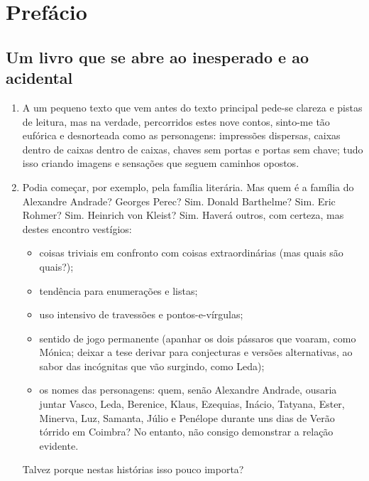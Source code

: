 \chapter{Prefácio}

\section{Um livro que se abre ao inesperado e ao acidental}

\begin{enumerate}
\item A um pequeno texto que vem antes do texto principal pede-se clareza e
pistas de leitura, mas na verdade, percorridos estes nove contos,
sinto-me tão eufórica e desnorteada como as personagens: impressões
dispersas, caixas dentro de caixas dentro de caixas, chaves sem portas e
portas sem chave; tudo isso criando imagens e sensações que seguem
caminhos opostos.

\item Podia começar, por exemplo, pela família literária. Mas quem é a
família do Alexandre Andrade? Georges Perec? Sim. Donald Barthelme? Sim. Eric Rohmer? Sim.
Heinrich von Kleist? Sim. Haverá outros, com certeza, mas destes encontro vestígios:

\begin{itemize}
\item{} coisas triviais em confronto com coisas extraordinárias (mas quais
são quais?);

\item{} tendência para enumerações e listas;

\item{} uso intensivo de travessões e pontos-e-vírgulas;

\item{} sentido de jogo permanente (apanhar os dois pássaros que voaram, como
Mónica; deixar a tese derivar para conjecturas e versões alternativas, ao sabor das incógnitas que vão
surgindo, como Leda);

\item{} os nomes das personagens: quem, senão Alexandre Andrade, ousaria
juntar Vasco, Leda, Berenice, Klaus, Ezequias, Inácio, Tatyana, Ester,
Minerva, Luz, Samanta, Júlio e Penélope durante uns dias de Verão
tórrido em Coimbra? No entanto, não consigo demonstrar a relação
evidente.
\end{itemize}

Talvez porque nestas histórias isso pouco importa?


\end{enumerate}
